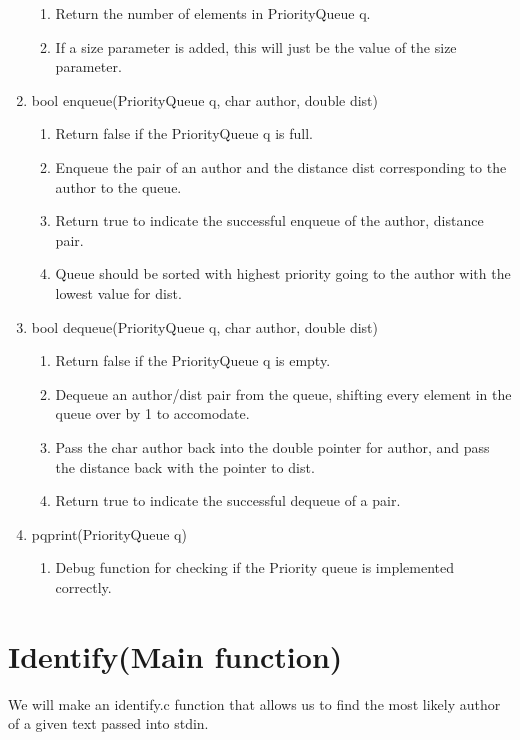 \documentclass[11pt]{article}
\begin{document}
\begin{enumerate}
\begin{enumerate}
	\item Return the number of elements in PriorityQueue q.
	\item If a size parameter is added, this will just be the value of the size parameter.
	\end{enumerate}
\item bool enqueue(PriorityQueue q, char author, double dist)
	\begin{enumerate}
	\item Return false if the PriorityQueue q is full.
	\item Enqueue the pair of an author and the distance dist corresponding to the author to the queue.
	\item Return true to indicate the successful enqueue of the author, distance pair.
	\item Queue should be sorted with highest priority going to the author with the lowest value for dist.
	\end{enumerate}
\item bool dequeue(PriorityQueue q, char author, double dist)
	\begin{enumerate}
	\item Return false if the PriorityQueue q is empty.
	\item Dequeue an author/dist pair from the queue, shifting every element in the queue over by 1 to accomodate.
	\item Pass the char author back into the double pointer for author, and pass the distance back with the pointer to dist.
	\item Return true to indicate the successful dequeue of a pair.
	\end{enumerate}
\item pqprint(PriorityQueue q)
	\begin{enumerate}
	\item Debug function for checking if the Priority queue is implemented correctly.
	\end{enumerate}
\end{enumerate}

\section{Identify(Main function)}\label{ss:main}
We will make an identify.c function that allows us to find the most likely author of a given text passed into stdin.
\end{document}
